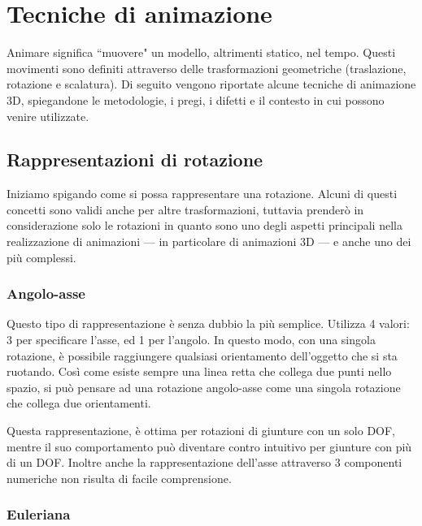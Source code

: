 
\chapter{Tecniche di animazione} %

\label{Chapter3} %

Animare significa ``muovere" un modello, altrimenti statico, nel tempo. Questi movimenti sono definiti attraverso delle trasformazioni geometriche (traslazione, rotazione e scalatura).
Di seguito vengono riportate alcune tecniche di animazione 3D, spiegandone le metodologie, i pregi, i difetti e il contesto in cui possono venire utilizzate.


\section{Rappresentazioni di rotazione}\label{Section3.1}
Iniziamo spigando come si possa rappresentare una rotazione. Alcuni di questi concetti sono validi anche per altre trasformazioni, tuttavia prenderò in considerazione solo le rotazioni in quanto sono uno degli aspetti principali nella realizzazione di animazioni --- in particolare di animazioni 3D --- e anche uno dei più complessi.


\subsection{Angolo-asse}
Questo tipo di rappresentazione è senza dubbio la più semplice.
Utilizza 4 valori: 3 per specificare l'asse, ed 1 per l'angolo. In questo modo, con una singola rotazione, è possibile raggiungere qualsiasi orientamento dell'oggetto che si sta ruotando. Così come esiste sempre una linea retta che collega due punti nello spazio, si può pensare ad una rotazione angolo-asse come una singola rotazione che collega due orientamenti.

Questa rappresentazione, è ottima per rotazioni di giunture con un solo DOF, mentre il suo comportamento può diventare contro intuitivo per giunture con più di un DOF. Inoltre anche la rappresentazione dell'asse attraverso 3 componenti numeriche non risulta di facile comprensione.

\subsection{Euleriana}

